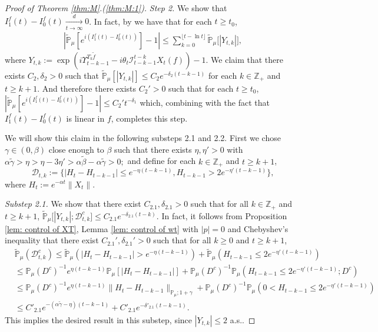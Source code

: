 \documentclass[12pt,a4paper]{amsart}
\theoremstyle{plain}
\theoremstyle{definition}
\numberwithin{equation}{section}
\begin{document}
\begin{proof}[Proof of Theorem \ref{thm:M}.(\ref{thm:M:1})]
  \emph{Step 2.} We show that $I^f_1(t) - I^f_0(t) \xrightarrow[t\to \infty]{d} 0$.
  In fact,  by \cite[Lemma 3.4.3]{Durrett2010Probability} we have that for each $t\geq t_0$,
  \begin{align}
    \label{eq:PM:S:1}
    |\mathbb{\widetilde{P}}_{\mu}[e^{i (I^f_1(t) - I^f_0(t) ) }] - 1|
    \leq \sum_{k=0}^{\lfloor t-\ln t \rfloor}\mathbb{\widetilde{P}}_{\mu}\big[|Y_{t,k}|\big],
  \end{align}
  where $ Y_{t,k} := \exp(i \Upsilon_{t-k-1}^{T_{k} \tilde f} - i\theta_t \mathcal I_{t-k-1}^{t-k} X_t(f)) - 1. $
  We claim that there exists $C_2, \delta_2>0$ such that \(\widetilde {\mathbb P}_\mu [|Y_{t,k}|] \leq C_2 e^{-\delta_2 (t-k-1)}\) for each $k\in \mathbb Z_+$ and $t\geq k+1$.
  And therefore there exists $C_2'>0$ such that for each $t \geq t_0$, $|\mathbb{\widetilde{P}}_{\mu}[e^{i (I^f_1(t)- I^f_0(t))}]-1| \leq C_2't^{-\delta_1}$  which, combining with the fact that $I^f_1(t) - I^f_0(t)$ is linear in $f$, completes this step.

  We will show this claim in the following substeps 2.1 and 2.2.
  First we chose $\gamma \in (0,\beta)$ close enough to $\beta$ such that there exists $\eta,\eta'>0$ with $ \alpha \tilde \gamma > \eta > \eta - 3\eta' > \alpha \tilde \beta - \alpha \tilde \gamma > 0;$ and define for each $k \in \mathbb Z_+$ and $t\geq k+1$,
  \[
    \mathcal{D}_{t,k}
    :=\{|H_t-H_{t-k-1}|\leq  e^{-\eta (t-k-1)}, H_{t-k-1}> 2e^{-\eta' (t-k-1)}\},
  \]
  where $H_t := e^{-\alpha t}\|X_t\|$.

  \emph{Substep 2.1.} We show that there exist $C_{2.1},\delta_{2.1} >0$ such that for all $k \in \mathbb Z_+$ and $t\geq k+1$, $ \mathbb{\widetilde{P}}_{\mu} \big[ |Y_{t,k}| ;\mathcal{D}^c_{t,k} \big] \leq C_{2.1} e^{-\delta_{2.1} (t-k)}.$
  In fact, it follows from Proposition \ref{lem: control of XT}, Lemma \ref{lem: control of wt} with $|p|=0$ and Chebyshev's inequality that there exist $C_{2.1}', \delta_{2.1}'>0$ such that for all $k \geq 0$ and $t\geq k+1$,
  \begin{align}
    \label{eq: prob of Dtkc}
    & \mathbb{\widetilde{P}}_{\mu}(\mathcal{D}_{t,k}^c)
    \leq \mathbb{\widetilde{P}}_{\mu}(|H_t-H_{t-k-1}| > e^{-\eta (t-k-1)})+\mathbb{\widetilde{P}}_{\mu}(H_{t-k-1}\leq 2e^{-\eta'(t-k-1)}) \\
    & \leq \mathbb{P}_{\mu}(D^c)^{-1}e^{\eta(t-k-1)}\mathbb{P}_{\mu}[|H_t-H_{t-k-1}|] +  \mathbb{P}_{\mu}(D^c)^{-1} \mathbb P_\mu(H_{t-k-1}\leq 2e^{-\eta'(t-k-1)}; D^c) \\
    & \leq \mathbb{P}_{\mu}(D^c)^{-1}  e^{\eta(t-k-1)}\|H_t - H_{t-k-1}\|_{\mathbb P_\mu; 1+\gamma} + \mathbb{P}_{\mu}(D^c)^{-1} \mathbb P_\mu(0<H_{t-k-1}\leq 2e^{-\eta'(t-k-1)}) \\
    & \leq C'_{2.1} e^{-(\alpha \tilde \gamma - \eta)(t-k-1)}+C'_{2.1} e^{-\delta'_{2.1}(t-k-1)}.
  \end{align}
  This implies the desired result in this substep, since $|Y_{t,k}| \leq 2$ a.s..


\end{proof}
\end{document}
